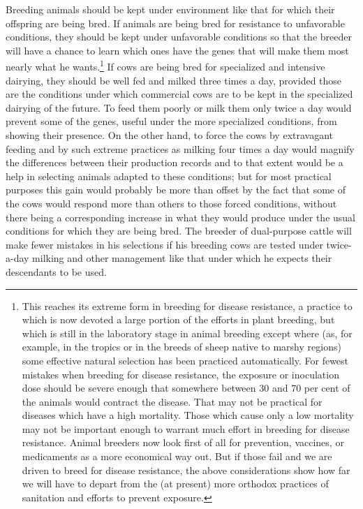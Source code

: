 Breeding animals should be kept under environment like that for
which their offspring are being bred. If animals are being bred for
resistance to unfavorable conditions, they should be kept under unfavorable
conditions so that the breeder will have a chance to learn which
ones have the genes that will make them most nearly what he
wants.\footnote{This reaches its extreme form in breeding for disease resistance, a practice to
which is now devoted a large portion of the efforts in plant breeding, but which is
still in the laboratory stage in animal breeding except where (as, for example, in
the tropics or in the breeds of sheep native to marshy regions) some effective natural
selection has been practiced automatically. For fewest mistakes when breeding for
disease resistance, the exposure or inoculation dose should be severe enough that
somewhere between 30 and 70 per cent of the animals would contract the disease.
That may not be practical for diseases which have a high mortality. Those which
cause only a low mortality may not be important enough to warrant much effort in
breeding for disease resistance. Animal breeders now look first of all for prevention,
vaccines, or medicaments as a more economical way out. But if those fail and we are
driven to breed for disease resistance, the above considerations show how far we will
have to depart from the (at present) more orthodox practices of sanitation and
efforts to prevent exposure.} If
cows are being bred for specialized and intensive dairying, they should
be well fed and milked three times a day, provided those are the conditions
under which commercial cows are to be kept in the specialized
dairying of the future. To feed them poorly or milk them only twice a
day would prevent some of the genes, useful under the more specialized
conditions, from showing their presence. On the other hand, to force
the cows by extravagant feeding and by such extreme practices as milking
four times a day would magnify the differences between their production
records and to that extent would be a help in selecting animals
adapted to these conditions; but for most practical purposes this gain
would probably be more than offset by the fact that some of the cows
would respond more than others to those forced conditions, without
there being a corresponding increase in what they would produce under
the usual conditions for which they are being bred. The breeder of
dual-purpose cattle will make fewer mistakes in his selections if his
breeding cows are tested under twice-a-day milking and other management
like that under which he expects their descendants to be used.

